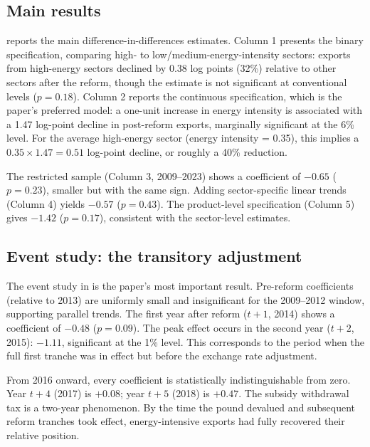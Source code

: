 \documentclass[12pt]{article}
\begin{document}
\subsection{Main results}

 reports the main difference-in-differences estimates. Column 1 presents the binary specification, comparing high- to low/medium-energy-intensity sectors: exports from high-energy sectors declined by 0.38 log points (32\%) relative to other sectors after the reform, though the estimate is not significant at conventional levels ($p = 0.18$). Column 2 reports the continuous specification, which is the paper's preferred model: a one-unit increase in energy intensity is associated with a 1.47 log-point decline in post-reform exports, marginally significant at the 6\% level. For the average high-energy sector (energy intensity = 0.35), this implies a $0.35 \times 1.47 = 0.51$ log-point decline, or roughly a 40\% reduction.

The restricted sample (Column 3, 2009--2023) shows a coefficient of $-0.65$ ($p = 0.23$), smaller but with the same sign. Adding sector-specific linear trends (Column 4) yields $-0.57$ ($p = 0.43$). The product-level specification (Column 5) gives $-1.42$ ($p = 0.17$), consistent with the sector-level estimates.



\subsection{Event study: the transitory adjustment}

The event study in  is the paper's most important result. Pre-reform coefficients (relative to 2013) are uniformly small and insignificant for the 2009--2012 window, supporting parallel trends. The first year after reform ($t+1$, 2014) shows a coefficient of $-0.48$ ($p = 0.09$). The peak effect occurs in the second year ($t+2$, 2015): $-1.11$, significant at the 1\% level. This corresponds to the period when the full first tranche was in effect but before the exchange rate adjustment.

From 2016 onward, every coefficient is statistically indistinguishable from zero. Year $t+4$ (2017) is $+0.08$; year $t+5$ (2018) is $+0.47$. The subsidy withdrawal tax is a two-year phenomenon. By the time the pound devalued and subsequent reform tranches took effect, energy-intensive exports had fully recovered their relative position.
\end{document}

